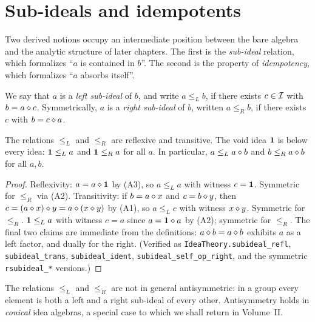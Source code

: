 \section{Sub-ideals and idempotents}\label{sec:idempotents}

Two derived notions occupy an intermediate position between the bare
algebra and the analytic structure of later chapters.  The first is the
\emph{sub-ideal} relation, which formalizes ``$a$ is contained in $b$''.
The second is the property of \emph{idempotency}, which formalizes ``$a$
absorbs itself''.

\begin{definition}\label{def:subideal}
We say that $a$ is a \emph{left sub-ideal} of $b$, and write
$a \le_L b$, if there exists $c \in \mathcal{I}$ with $b = a \mathbin{\diamond} c$.
Symmetrically, $a$ is a \emph{right sub-ideal} of $b$, written
$a \le_R b$, if there exists $c$ with $b = c \mathbin{\diamond} a$.
\end{definition}

\begin{lemma}\label{lem:subideal-order}
The relations $\le_L$ and $\le_R$ are reflexive and transitive.  The void
idea $\mathbf{1}$ is below every idea: $\mathbf{1} \le_L a$ and $\mathbf{1} \le_R a$ for
all $a$.  In particular, $a \le_L a \mathbin{\diamond} b$ and $b \le_R a \mathbin{\diamond} b$
for all $a, b$.
\end{lemma}

\begin{proof}
Reflexivity: $a = a \mathbin{\diamond} \mathbf{1}$ by (A3), so $a \le_L a$ with witness
$c = \mathbf{1}$.  Symmetric for $\le_R$ via (A2).  Transitivity: if
$b = a \mathbin{\diamond} x$ and $c = b \mathbin{\diamond} y$, then
$c = (a \mathbin{\diamond} x) \mathbin{\diamond} y = a \mathbin{\diamond} (x \mathbin{\diamond} y)$ by (A1), so
$a \le_L c$ with witness $x \mathbin{\diamond} y$.  Symmetric for $\le_R$.
$\mathbf{1} \le_L a$ with witness $c = a$ since $a = \mathbf{1} \mathbin{\diamond} a$ by (A2);
symmetric for $\le_R$.  The final two claims are immediate from the
definitions: $a \mathbin{\diamond} b = a \mathbin{\diamond} b$ exhibits $a$ as a left factor,
and dually for the right.  (Verified as \texttt{IdeaTheory.subideal\_refl},
\texttt{subideal\_trans}, \texttt{subideal\_ident},
\texttt{subideal\_self\_op\_right}, and the symmetric \texttt{rsubideal\_*}
versions.)
\end{proof}

\begin{remark}
The relations $\le_L$ and $\le_R$ are not in general antisymmetric: in a
group every element is both a left and a right sub-ideal of every other.
Antisymmetry holds in \emph{conical} idea algebras, a special case to
which we shall return in Volume~II.
\end{remark}

